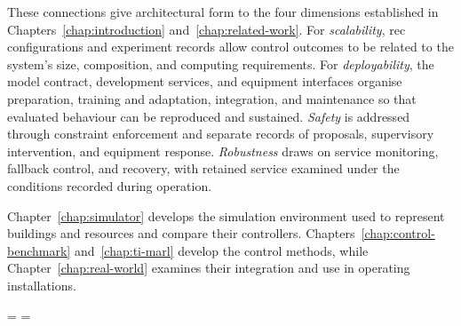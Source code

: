 These connections give architectural form to the four dimensions established in Chapters~\ref{chap:introduction} and~\ref{chap:related-work}. For \emph{scalability}, \gls{rec} configurations and experiment records allow control outcomes to be related to the system's size, composition, and computing requirements. For \emph{deployability}, the model contract, development services, and equipment interfaces organise preparation, training and adaptation, integration, and maintenance so that evaluated behaviour can be reproduced and sustained. \emph{Safety} is addressed through constraint enforcement and separate records of proposals, supervisory intervention, and equipment response. \emph{Robustness} draws on service monitoring, fallback control, and recovery, with retained service examined under the conditions recorded during operation.

Chapter~\ref{chap:simulator} develops the simulation environment used to represent buildings and resources and compare their controllers. Chapters~\ref{chap:control-benchmark} and~\ref{chap:ti-marl} develop the control methods, while Chapter~\ref{chap:real-world} examines their integration and use in operating installations.

\setlength{\parskip}{\architectureoriginalparskip}
\clearpage
\setlength{\textfloatsep}{\architectureoriginaltextfloatsep}
\setlength{\intextsep}{\architectureoriginalintextsep}
\setlength{\abovecaptionskip}{\architectureoriginalcaptionskip}
\flushbottom
\clubpenalty=\architectureoriginalclubpenalty
\widowpenalty=\architectureoriginalwidowpenalty

